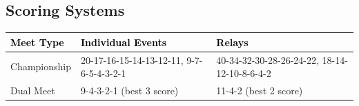 
%

%

%



\subsection*{Scoring Systems}

\begin{table}[H]
\centering
\renewcommand{\arraystretch}{1.4}
\begin{tabular}{p{3.5cm} p{5cm} p{5.5cm}}
\toprule
\rowcolor{teamprimary!25}
\textbf{\textcolor{black}{Meet Type}} & \textbf{\textcolor{black}{Individual Events}} & \textbf{\textcolor{black}{Relays}} \\
\midrule
\rowcolor{teamsecondary!15}
Championship & 20-17-16-15-14-13-12-11, 9-7-6-5-4-3-2-1 & 40-34-32-30-28-26-24-22, 18-14-12-10-8-6-4-2 \\
\rowcolor{teamprimary!10}
Dual Meet & 9-4-3-2-1 (best 3 score) & 11-4-2 (best 2 score) \\
\bottomrule
\end{tabular}
\end{table}

